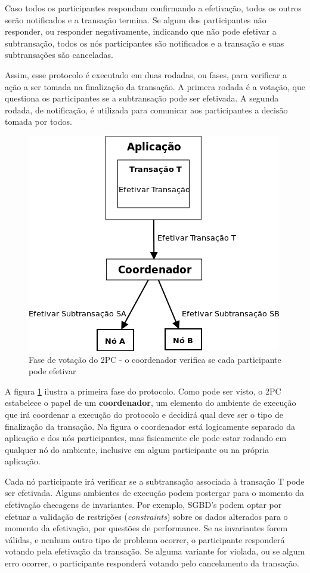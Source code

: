 \documentclass[11pt,twoside,a4paper]{book}
\begin{document}
Caso todos os participantes respondam confirmando a efetivação, todos os outros serão notificados e a transação termina. Se algum dos participantes não responder, ou responder negativamente, indicando que não pode efetivar a subtransação, todos os nós participantes são notificados e a transação e suas subtransações são canceladas.

Assim, esse protocolo é executado em duas rodadas, ou fases, para verificar a ação a ser tomada na finalização da transação. A primera rodada é a votação, que questiona os participantes se a subtransação pode ser efetivada. A segunda rodada, de notificação, é utilizada para comunicar aos participantes a decisão tomada por todos.

\begin{figure}
  \centering
  \includegraphics[width=.50\textwidth]{fase_votacao_2pc} 
  \caption{Fase de votação do 2PC - o coordenador verifica se cada participante pode efetivar}
  \label{fig:fase_votacao_2pc} 
\end{figure}

A figura \ref{fig:fase_votacao_2pc} ilustra a primeira fase do protocolo. Como pode ser visto, o 2PC estabelece o papel de um \textbf{coordenador}, um elemento do ambiente de execução que irá coordenar a execução do protocolo e decidirá qual deve ser o tipo de finalização da transação. Na figura o coordenador está logicamente separado da aplicação e dos nós participantes, mas fisicamente ele pode estar rodando em qualquer nó do ambiente, inclusive em algum participante ou na própria aplicação.

Cada nó participante irá verificar se a subtransação associada à transação T pode ser efetivada. Alguns ambientes de execução podem postergar para o momento da efetivação checagens de invariantes. Por exemplo, SGBD's podem optar por efetuar a validação de restrições (\emph{constraints}) sobre os dados alterados para o momento da efetivação, por questões de performance. Se as invariantes forem válidas, e nenhum outro tipo de problema ocorrer, o participante responderá votando pela efetivação da transação. Se alguma variante for violada, ou se algum erro ocorrer, o participante responderá votando pelo cancelamento da transação.
\end{document}
